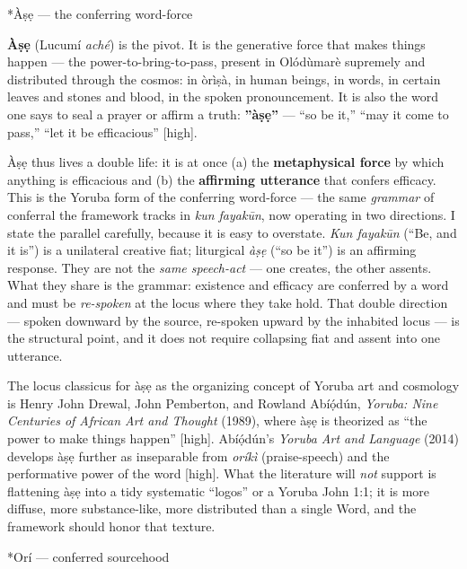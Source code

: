 \documentclass[11pt]{article}
\makeatletter
\renewcommand\paragraph{\@startsection{paragraph}{4}{\z@}{2ex plus 1ex}{0.4ex}{\normalfont\normalsize\bfseries}}
\makeatother
\begin{document}
\paragraph*{Àṣẹ — the conferring word-force}

\textbf{Àṣẹ} (Lucumí \emph{aché}) is the pivot. It is the generative force that makes things happen — the power-to-bring-to-pass, present in Olódùmarè supremely and distributed through the cosmos: in òrìṣà, in human beings, in words, in certain leaves and stones and blood, in the spoken pronouncement. It is also the word one says to seal a prayer or affirm a truth: \textbf{''àṣẹ''} — ``so be it,'' ``may it come to pass,'' ``let it be efficacious'' [high].

Àṣẹ thus lives a double life: it is at once (a) the \textbf{metaphysical force} by which anything is efficacious and (b) the \textbf{affirming utterance} that confers efficacy. This is the Yoruba form of the conferring word-force — the same \emph{grammar} of conferral the framework tracks in \emph{kun fayakūn}, now operating in two directions. I state the parallel carefully, because it is easy to overstate. \emph{Kun fayakūn} (``Be, and it is'') is a unilateral creative fiat; liturgical \emph{àṣẹ} (``so be it'') is an affirming response. They are not the \emph{same speech-act} — one creates, the other assents. What they share is the grammar: existence and efficacy are conferred by a word and must be \emph{re-spoken} at the locus where they take hold. That double direction — spoken downward by the source, re-spoken upward by the inhabited locus — is the structural point, and it does not require collapsing fiat and assent into one utterance.

The locus classicus for àṣẹ as the organizing concept of Yoruba art and cosmology is Henry John Drewal, John Pemberton, and Rowland Abíọ́dún, \emph{Yoruba: Nine Centuries of African Art and Thought} (1989), where àṣẹ is theorized as ``the power to make things happen'' [high]. Abíọ́dún's \emph{Yoruba Art and Language} (2014) develops àṣẹ further as inseparable from \emph{oríkì} (praise-speech) and the performative power of the word [high]. What the literature will \emph{not} support is flattening àṣẹ into a tidy systematic ``logos'' or a Yoruba John 1:1; it is more diffuse, more substance-like, more distributed than a single Word, and the framework should honor that texture. 

\paragraph*{Orí — conferred sourcehood}
\end{document}
